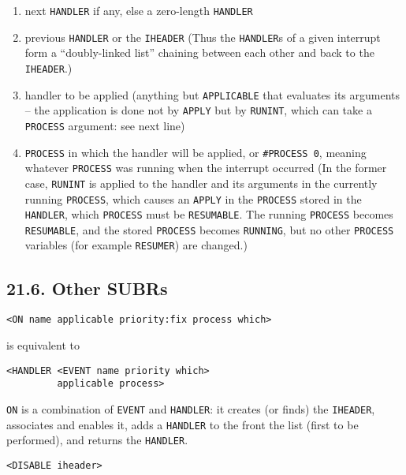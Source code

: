\documentclass[a4paper,]{article}
\providecommand{\tightlist}{%
  \setlength{\itemsep}{0pt}\setlength{\parskip}{0pt}}
\begin{document}
\begin{enumerate}
\def\labelenumi{\arabic{enumi}.}
\tightlist
\item
  next \texttt{HANDLER} if any, else a zero-length \texttt{HANDLER}
\item
  previous \texttt{HANDLER} or the \texttt{IHEADER} (Thus the \texttt{HANDLER}s of a given interrupt form a ``doubly-linked
  list'' chaining between each other and back to the \texttt{IHEADER}.)
\item
  handler to be applied (anything but \texttt{APPLICABLE} that evaluates its arguments -- the application is done not by
  \texttt{APPLY} but by \texttt{RUNINT}, which can take a \texttt{PROCESS} argument: see next
  line)
\item
  \texttt{PROCESS} in which the handler will be applied, or \texttt{\#PROCESS\ 0}, meaning whatever \texttt{PROCESS} was
  running when the interrupt occurred (In the former case, \texttt{RUNINT} is applied to the handler and its arguments in
  the currently running \texttt{PROCESS}, which causes an \texttt{APPLY} in the \texttt{PROCESS} stored in the
  \texttt{HANDLER}, which \texttt{PROCESS} must be \texttt{RESUMABLE}. The running \texttt{PROCESS} becomes
  \texttt{RESUMABLE}, and the stored \texttt{PROCESS} becomes \texttt{RUNNING}, but no other \texttt{PROCESS} variables
  (for example \texttt{RESUMER}) are changed.)
\end{enumerate}

\subsection{21.6. Other SUBRs}\label{other-subrs}

\begin{verbatim}
<ON name applicable priority:fix process which>
\end{verbatim}

 is equivalent to

\begin{verbatim}
<HANDLER <EVENT name priority which>
         applicable process>
\end{verbatim}

\texttt{ON} is a combination of \texttt{EVENT} and \texttt{HANDLER}: it creates (or finds) the \texttt{IHEADER}, associates
and enables it, adds a \texttt{HANDLER} to the front the list (first to be performed), and returns the \texttt{HANDLER}.

\begin{verbatim}
<DISABLE iheader>
\end{verbatim}
\end{document}
